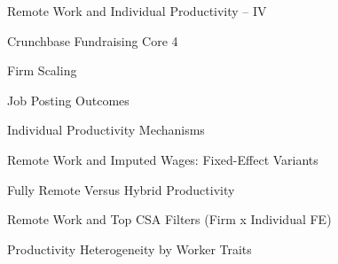 \documentclass{article}
\newcommand{\TableInput}[2][\linewidth]{}
\begin{document}
\begin{table}[H]\centering
  \caption{Remote Work and Individual Productivity -- IV}
  \TableInput{../../results/cleaned/tex/user_productivity_precovid_total_iv_single.tex}
\end{table}

\begin{table}[H]\centering
  \caption{Crunchbase Fundraising Core 4}
  \TableInput{../../results/cleaned/tex/firm_scaling_crunchbase_fundraising_core4.tex}
\end{table}

\begin{table}[H]\centering
  \caption{Firm Scaling}
  \TableInput{../../results/cleaned/tex/firm_scaling_precovid_cols1_4.tex}
\end{table}

\begin{table}[H]\centering
  \caption{Job Posting Outcomes}
  \TableInput{../../results/cleaned/tex/firm_scaling_precovid_cols5_6.tex}
\end{table}

\begin{table}[H]\centering
  \caption{Individual Productivity Mechanisms}
  \TableInput{../../results/cleaned/tex/user_mechanisms_keep_remote_precovid.tex}
\end{table}

\begin{table}[H]\centering
  \caption{Remote Work and Imputed Wages: Fixed-Effect Variants}
  \TableInput{../../results/cleaned/tex/user_wage_fe_variants_precovid_log_salary.tex}
\end{table}

\begin{table}[H]\centering
  \caption{Fully Remote Versus Hybrid Productivity}
  \TableInput{../../results/cleaned/tex/user_productivity_fr_focus_precovid.tex}
\end{table}

\begin{table}[H]\centering
  \caption{Remote Work and Top CSA Filters (Firm x Individual FE)}
  \TableInput{../../results/cleaned/tex/user_productivity_top_metros_firmbyuser.tex}
\end{table}

\begin{table}[H]\centering
  \caption{Productivity Heterogeneity by Worker Traits}
  \TableInput{../../results/cleaned/tex/user_productivity_traits_dual_precovid_ols.tex}
\end{table}
\end{document}
